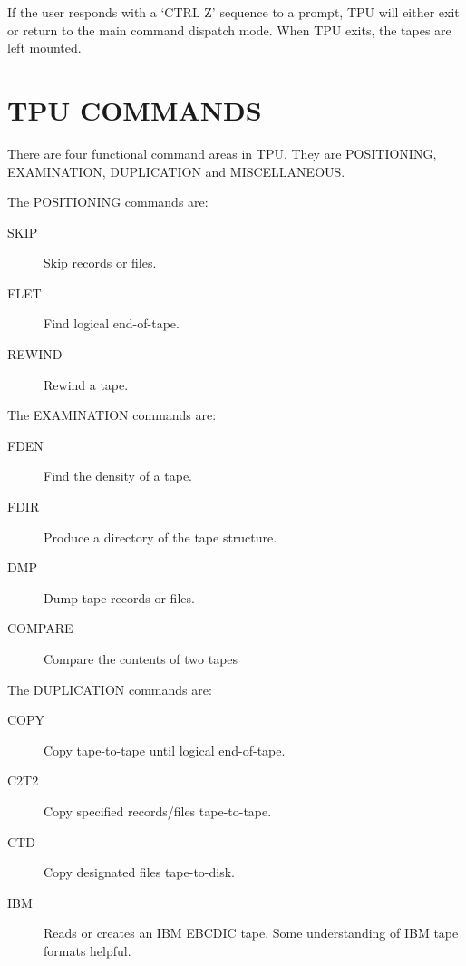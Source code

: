 If the user responds with a `CTRL Z' sequence to a prompt, TPU will either exit
or return to the main command dispatch mode.
When TPU exits, the tapes are left mounted.

\section{TPU COMMANDS}

There are four functional command areas in TPU.
They are POSITIONING, EXAMINATION, DUPLICATION and MISCELLANEOUS.


The POSITIONING commands are:

\begin{description}
\begin{description}
\item [SKIP~~~]	Skip records or files.
\item [FLET~~~]	Find logical end-of-tape.
\item [REWIND~]	Rewind a tape.
\end{description}
\end{description}

The EXAMINATION commands are:

\begin{description}
\begin{description}
\item[FDEN~~~~]	Find the density of a tape.
\item[FDIR~~~~]	Produce a directory of the tape structure.
\item[DMP~~~~~]	Dump tape records or files.
\item[COMPARE~] Compare the contents of two tapes
\end{description}
\end{description}

The DUPLICATION commands are:

\begin{description}
\begin{description}
\item[COPY~~~~]	Copy tape-to-tape until logical end-of-tape.
\item[C2T2~~~~]	Copy specified records/files tape-to-tape.
\item[CTD~~~~~]	Copy designated files tape-to-disk.
\item[IBM~~~~~]	Reads or creates an IBM EBCDIC tape. Some understanding of IBM 
tape formats helpful.
\end{description}
\end{description}


